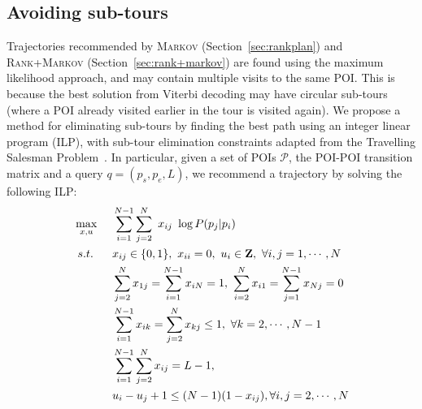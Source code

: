 \secmoveup
\subsection{Avoiding sub-tours} %
\label{sec:nosubtour}

Trajectories recommended by \textsc{Markov} (Section~\ref{sec:rankplan}) and \textsc{Rank+Markov} (Section~\ref{sec:rank+markov})
are found using the maximum likelihood approach, and may contain multiple visits to the same POI.
This is because the best solution from Viterbi decoding %
may have
circular sub-tours (where a POI already visited earlier in the tour is visited again).
We propose a method for eliminating sub-tours by %
%
finding the best path using an integer linear program (ILP),
with sub-tour elimination constraints adapted from the Travelling Salesman Problem~\cite{opt98}.
In particular, given a set of POIs $\mathcal{P}$, the POI-POI transition matrix and a query $q = (p_s, p_e, L)$,
we recommend a trajectory by solving the following ILP:
\eqmoveup
\vspace{-0.3em}
\begin{alignat}{5}
\eqmoveup
& \max_{x,u}  ~&& \sum_{i=1}^{N-1} \sum_{j=2}^N ~x_{ij} ~\log P(p_j | p_i)                                                \nonumber \\
& ~s.t. ~&& x_{ij} \in \{0, 1\}, ~x_{ii} = 0, ~u_i \in \mathbf{Z}, ~\forall i, j = 1, \cdots, N                    \label{eq:cons1} \\
&        && \sum_{j=2}^N x_{1j} = \sum_{i=1}^{N-1} x_{iN} = 1, ~\sum_{i=2}^N x_{i1} = \sum_{j=1}^{N-1} x_{Nj} = 0  \label{eq:cons2} \\
&        && \sum_{i=1}^{N-1} x_{ik} = \sum_{j=2}^N x_{kj} \le 1,   ~\forall k=2, \cdots, N-1                       \label{eq:cons3} \\
&        && \sum_{i=1}^{N-1} \sum_{j=2}^N x_{ij} = L-1,                                                            \label{eq:cons4} \\
&        && u_i - u_j + 1 \le (N-1) (1-x_{ij}),                     \forall i, j = 2, \cdots, N                    \label{eq:cons5}
\end{alignat}
